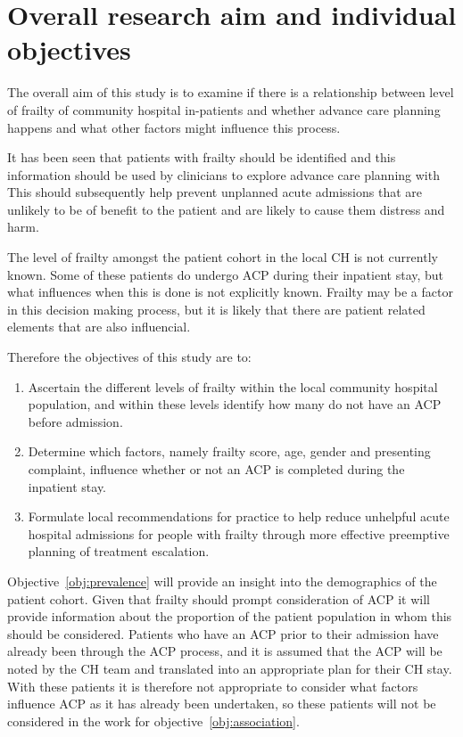 \documentclass
[
	12pt,
	a4paper,
	oneside,
]{report}
\begin{document}






\section{Overall research aim and individual objectives}

The overall aim of this study is to examine if there is a relationship 
between
level of frailty of community hospital in-patients and whether advance care planning
happens and what other factors might influence this process.

It has been seen that patients with frailty should be identified and this 
information should be used by clinicians to explore advance care planning with 
This should subsequently help prevent unplanned acute admissions that are 
unlikely to be of benefit to the patient and are likely to cause them distress 
and harm.

The level of frailty amongst the patient cohort in the local CH is not currently
known. Some of these patients do undergo ACP during their inpatient stay, but what 
influences when this is done is not explicitly known. Frailty may be a factor
in this decision making process, but it is likely that there are patient 
related elements that are also influencial.

Therefore the objectives of this study are to:
\begin{enumerate}
\item	Ascertain the different levels of frailty within the local 
		community hospital population, and within these levels identify 
		how many do not have an ACP before admission.\label{obj:prevalence}
\item	Determine which factors, namely frailty score, age, gender and
		presenting complaint, influence whether or not an ACP is 
		completed during the inpatient stay.\label{obj:association}
\item	Formulate local recommendations for practice to help reduce unhelpful
		acute hospital admissions for people with frailty through more 
		effective preemptive planning of treatment escalation.
		\label{obj:recommend}
\end{enumerate}

Objective~\ref{obj:prevalence} will provide an insight into the demographics
of the patient cohort. Given that frailty should prompt consideration of ACP
it will provide information about the proportion of the patient population in
whom this should be considered. Patients who have an ACP prior to their admission
have already been through the ACP process, and it is assumed that the ACP will be 
noted by the CH team and translated into an appropriate plan for their CH stay.
With these patients it is therefore not appropriate to consider what factors 
influence ACP as it has already been undertaken, so these patients will not
be considered in the work for objective~\ref{obj:association}.
\end{document}
